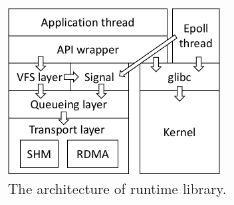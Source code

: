 \begin{figure}[htbp]
	\centering
	\includegraphics[width=0.5\textwidth]{images/libsd_architecture}
	\caption{The architecture of \libipc{} runtime library.}
	\label{socksdirect:fig:libsd-architecture}
\end{figure}



